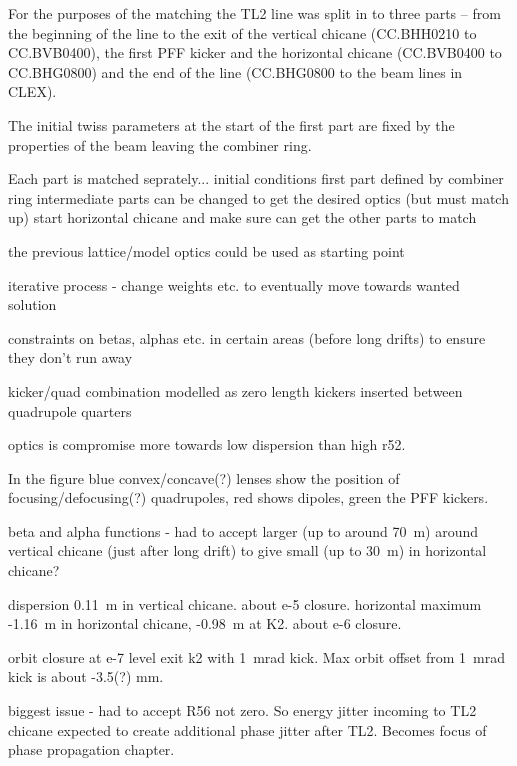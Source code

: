For the purposes of the matching the TL2 line was split in to three parts -- from the beginning of the line to the exit of the vertical chicane (CC.BHH0210 to CC.BVB0400), the first PFF kicker and the horizontal chicane (CC.BVB0400 to CC.BHG0800) and the end of the line (CC.BHG0800 to the beam lines in CLEX).

The initial twiss parameters at the start of the first part are fixed by the properties of the beam leaving the combiner ring. 


Each part is matched seprately...
initial conditions first part defined by combiner ring
intermediate parts can be changed to get the desired optics (but must match up)
start horizontal chicane and make sure can get the other parts to match

the previous lattice/model optics could be used as starting point

iterative process - change weights etc. to eventually move towards wanted solution

constraints on betas, alphas etc. in certain areas (before long drifts) to ensure they don't run away

kicker/quad combination modelled as zero length kickers inserted between quadrupole quarters

optics is compromise more towards low dispersion than high r52.

In the figure blue convex/concave(?) lenses show the position of focusing/defocusing(?) quadrupoles, red shows dipoles, green the PFF kickers.

beta and alpha functions - had to accept larger (up to around 70~m) around vertical chicane (just after long drift) to give small (up to 30~m) in horizontal chicane?

dispersion 0.11~m in vertical chicane. about e-5 closure.
horizontal maximum -1.16~m in horizontal chicane, -0.98~m at K2. about e-6 closure.

orbit closure at e-7 level exit k2 with 1~mrad kick. Max orbit offset from 1~mrad kick is about -3.5(?) mm.

biggest issue - had to accept R56 not zero. So energy jitter incoming to TL2 chicane expected to create additional phase jitter after TL2. Becomes focus of phase propagation chapter.


